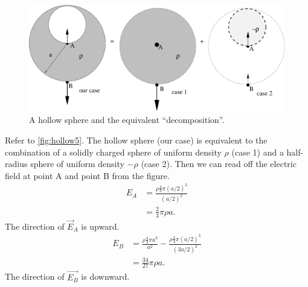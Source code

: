 \documentclass{esg8022pset}
\begin{document}
\begin{solution}
  \begin{figure}[ht]
    \begin{center}
      \includegraphics[width=12cm]{ps02_sol_01}
      \caption{A hollow sphere and the equivalent ``decomposition''.}
      \label{fig:hollow5}
    \end{center}
  \end{figure}

  Refer to \autoref{fig:hollow5}.  The hollow sphere (our case) is equivalent to the combination of a solidly charged sphere of uniform density $\rho$ (case 1) and a half-radius sphere of uniform density $-\rho$ (case 2).  Then we can read off the electric field at point A and point B from the figure.
  \begin{align*}
  E_A & = \frac{\rho \frac{4}{3}\pi(a/2)^3}{(a/2)^2} \\
      & = \frac{2}{3}\pi\rho a.
  \end{align*}
  The direction of $\vec E_A$ is upward.
  \begin{align*}
  E_B & = \frac{\rho \frac{4}{3}\pi a^3}{a^2}-\frac{\rho \frac{4}{3}\pi(a/2)^3}{(3a/2)^2} \\
      & = \frac{34}{27}\pi\rho a.
  \end{align*}
  The direction of $\vec{E_B}$ is downward. 
\end{solution}
\end{document}
